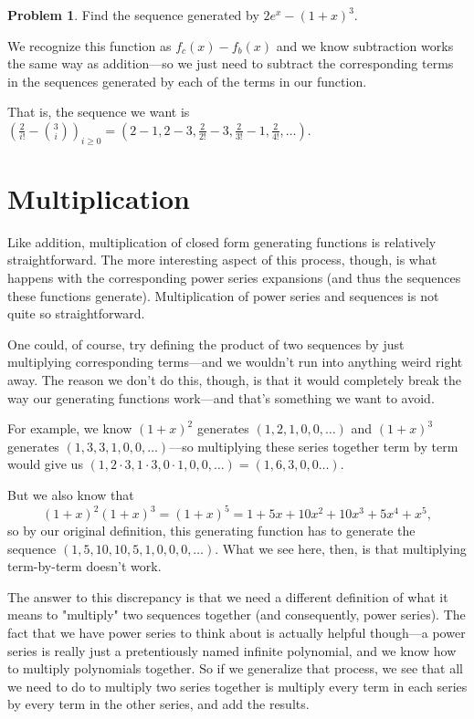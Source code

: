\documentclass{article}
\theoremstyle{definition}
\newtheorem{problem}{Problem}
\begin{document}
\begin{problem}
Find the sequence generated by $2 e^{x}-(1+x)^{3}$.
\end{problem}

We recognize this function as $f_{c}(x)-f_{b}(x)$ and we know subtraction works the same way as addition---so we just need to subtract the corresponding terms in the sequences generated by each of the terms in our function.

That is, the sequence we want is $\left(\frac{2}{i!}-\binom{3}{i}\right)_{i \geq 0}=\left(2-1,2-3, \frac{2}{2!}-3, \frac{2}{3!}-1, \frac{2}{4!}, \ldots\right)$.

\section*{Multiplication}
Like addition, multiplication of closed form generating functions is relatively straightforward. The more interesting aspect of this process, though, is what happens with the corresponding power series expansions (and thus the sequences these functions generate). Multiplication of power series and sequences is not quite so straightforward.

One could, of course, try defining the product of two sequences by just multiplying corresponding terms---and we wouldn't run into anything weird right away. The reason we don't do this, though, is that it would completely break the way our generating functions work---and that's something we want to avoid.

For example, we know $(1+x)^{2}$ generates $(1,2,1,0,0, \ldots)$ and $(1+x)^{3}$ generates $(1,3,3,1,0,0, \ldots)$---so multiplying these series together term by term would give us $(1,2 \cdot 3,1 \cdot 3,0 \cdot 1,0,0, \ldots)=(1,6,3,0,0 \ldots)$.

But we also know that
\[(1+x)^{2}(1+x)^{3}=(1+x)^{5}=1+5 x+10 x^{2}+10 x^{3}+5 x^{4}+x^{5},\]
so by our original definition, this generating function has to generate the sequence $(1,5,10,10,5,1,0,0,0, \ldots)$. What we see here, then, is that multiplying term-by-term doesn't work.

The answer to this discrepancy is that we need a different definition of what it means to "multiply" two sequences together (and consequently, power series). The fact that we have power series to think about is actually helpful though---a power series is really just a pretentiously named infinite polynomial, and we know how to multiply polynomials together. So if we generalize that process, we see that all we need to do to multiply two series together is multiply every term in each series by every term in the other series, and add the results.
\end{document}
